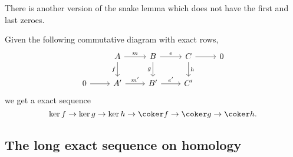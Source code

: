 \documentclass[main.tex]{subfiles}
\begin{document}
There is another version of the snake lemma which does not have the first and last zeroes.
\begin{theorem}
  \label{thm:snake_lemma_ii}
  Given the following commutative diagram with exact rows,
  \begin{equation*}
    \begin{tikzcd}
      & A
      \arrow[d, swap, "f"]
      \arrow[r, "m"]
      & B
      \arrow[r, "e"]
      \arrow[d, swap, "g"]
      & C
      \arrow[r]
      \arrow[d, "h"]
      & 0
      \\
      0
      \arrow[r]
      & A'
      \arrow[r, "m'"]
      & B'
      \arrow[r, "e'"]
      & C'
    \end{tikzcd}
  \end{equation*}
  we get a exact sequence
  \begin{equation*}
    \ker f \to \ker g \to \ker h \to \coker f \to \coker g \to \coker h.
  \end{equation*}
\end{theorem}

\subsection{The long exact sequence on homology}
\label{ssc:the_long_exact_sequence_on_homology}
\end{document}
